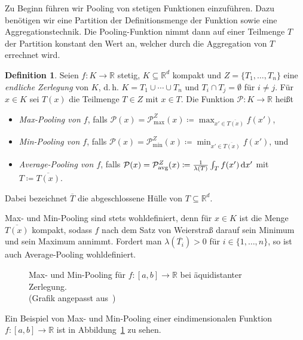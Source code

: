 \documentclass[paper=a4, 	%
		fontsize=11pt,
		abstract=true, 	%
		headsepline, 	%
		notitlepage	%
		]{scrartcl}
\theoremstyle{definition}
\newtheorem{definition}[theorem]{Definition}
\newcommand{\R}{\mathbb{R}}
\newcommand{\diff}{\,\textrm{d}}
\newcommand{\avg}{\textnormal{avg}}
\begin{document}
Zu Beginn führen wir Pooling von stetigen Funktionen einzuführen.
Dazu benötigen wir eine Partition der Definitionsmenge der Funktion sowie eine Aggregationstechnik.
Die Pooling-Funktion nimmt dann auf einer Teilmenge $T$ der Partition konstant den Wert an, welcher durch die Aggregation von $T$ errechnet wird. 

\begin{definition}
    Seien $f: K \rightarrow \R$ stetig, $K\subseteq \R^d$ kompakt und $Z=\{T_1,\dots, T_n\}$ eine \emph{endliche Zerlegung} von $K$, d.\,h. $K = T_1 \cup \cdots \cup T_n$ und $T_i \cap T_j = \emptyset$ für $i \neq j$.
    Für $x\in K$ sei $T(x)$ die Teilmenge $T\in Z$ mit $x\in T$.
    Die Funktion $\mathcal{P}: K\rightarrow \R$ heißt
    \begin{itemize}
        \item \emph{Max-Pooling von $f$}, falls $\mathcal{P}(x) = \mathcal{P}_{\max}^Z(x) \coloneqq \max_{x'\in \overline{T(x)}} f(x')$,
        \item \emph{Min-Pooling von $f$}, falls $\mathcal{P}(x) = \mathcal{P}_{\min}^Z(x) \coloneqq \min_{x'\in \overline{T(x)}} f(x')$, und
        \item \emph{Average-Pooling von $f$}, falls $\mathcal{P}(x) = \mathcal{P}_{\avg}^Z(x) \coloneqq \frac{1}{\lambda(T)} \int_{T} f(x') \diff x'$ mit $T \coloneqq \overline{T(x)}$.
    \end{itemize}
    Dabei bezeichnet $\overline{T}$ die abgeschlossene Hülle von $T\subseteq \R^d$.
\end{definition}

Max- und Min-Pooling sind stets wohldefiniert, denn für $x\in K$ ist die Menge $\overline{T(x)}$ kompakt, sodass $f$ nach dem Satz von Weierstraß darauf sein Minimum und sein Maximum annimmt.
Fordert man $\lambda{\left( \overline{T_i}\right)} > 0$ für $i\in\{ 1, \dots, n\}$, so ist auch Average-Pooling wohldefiniert.

\begin{figure}
    \centering
    
    \caption{Max- und Min-Pooling für $f:[a,b]\rightarrow\R$ bei äquidistanter Zerlegung.\\
    {\scriptsize (Grafik angepasst aus~\cite{Calin2020})}}
    \label{fig:equidistant-pooling}
\end{figure}

Ein Beispiel von Max- und Min-Pooling einer eindimensionalen Funktion $f:[a,b]\rightarrow \R$ ist in Abbildung~\ref{fig:equidistant-pooling} zu sehen.
\end{document}
